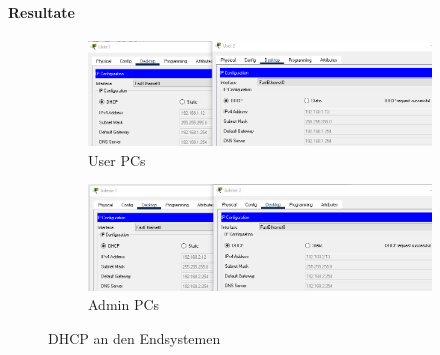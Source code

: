 \paragraph{Resultate}
\begin{figure}[!htb]
    \centering
    \begin{subfigure}{\textwidth}
        \includegraphics[width=\textwidth,height=.85\textwidth,keepaspectratio]{./img/users_dhcp.png}
        \caption{User PCs}
    \end{subfigure}
    \begin{subfigure}{\textwidth}
        \includegraphics[width=\textwidth,height=.85\textwidth,keepaspectratio]{./img/admins_dhcp.png}
        \caption{Admin PCs}
    \end{subfigure}
    \caption{DHCP an den Endsystemen}
\end{figure}

